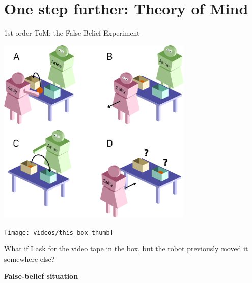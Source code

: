 \documentclass[compress]{beamer}
\begin{document}
\section[Theory of Mind]{One step further: Theory of Mind}
%
{ \paper{Wimmer and Perner, {\bf Beliefs about beliefs: Representation and
constraining function [...]}, Cognition, 1983]%
}
\begin{frame}{1st order ToM: the False-Belief Experiment}

        \begin{center} 
            \includegraphics[width=0.7\textwidth]{sally_ann.pdf}
        \end{center}
\end{frame}
}

\begin{frame}[plain]

    \begin{center}
        \texttt{[image: videos/this\_box\_thumb]}

        What if I ask for the video tape in the box, but the robot previously
        moved it somewhere else?


    \pause

        {\bf False-belief situation}
    \end{center}
\end{frame}

\end{document}
